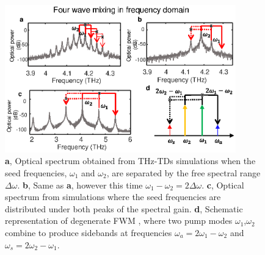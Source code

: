 \documentclass[10pt,letterpaper]{article}%
\begin{document}
\begin{figure}[h]
\begin{center}
\includegraphics[width=10cm]{figs/FWM.eps}
\end{center}
\caption{\textbf{a}, Optical spectrum
obtained from THz-TDs simulations when the seed frequencies, $\omega_{1}$ and
$\omega_{2}$, are separated by the free spectral range $\Delta\omega$.
\textbf{b}, Same as \textbf{a}, however this time $\omega_{1}-\omega
_{2}=2\Delta\omega$. \textbf{c}, Optical spectrum from simulations where the
seed frequencies are distributed under both peaks of the spectral gain.
\textbf{d}, Schematic representation of degenerate FWM
\cite{butcher1991elements}, where two pump modes $\omega_{1}$,$\omega_{2}$
combine to produce sidebands at frequencies $\omega_{a}=2\omega_{1}-\omega
_{2}$ and $\omega_{s}=2\omega_{2}-\omega_{1}$.}%
\label{fig:img04}%
\end{figure}
\end{document}
